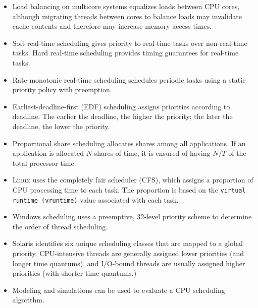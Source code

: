 \begin{itemize}
    \item Load balancing on multicore systems equalizes loads between CPU cores, although migrating threads between cores to balance loads may invalidate cache contents and therefore may increase memory access times.
    \item Soft real-time scheduling gives priority to real-time tasks over non-real-time tasks. Hard real-time scheduling provides timing guarantees for real-time tasks.
    \item Rate-monotonic real-time scheduling schedules periodic tasks using a static priority policy with preemption.
    \item Earliest-deadline-first (EDF) scheduling assigns priorities according to deadline. The earlier the deadline, the higher the priority; the later the deadline, the lower the priority.
    \item Proportional share scheduling allocates shares among all applications. If an application is allocated $N$ shares of time, it is ensured of having $N / T$ of the total processor time.
    \item Linux uses the completely fair scheduler (CFS), which assigns a proportion of CPU processing time to each task. The proportion is based on the \texttt{virtual runtime (vruntime)} value associated with each task.
    \item Windows scheduling uses a preemptive, 32-level priority scheme to determine the order of thread scheduling.
    \item Solaris identifies six unique scheduling classes that are mapped to a global priority. CPU-intensive threads are generally assigned lower priorities (and longer time quantums), and I/O-bound threads are usually assigned higher priorities (with shorter time quantums.)
    \item Modeling and simulations can be used to evaluate a CPU scheduling algorithm.
\end{itemize}
